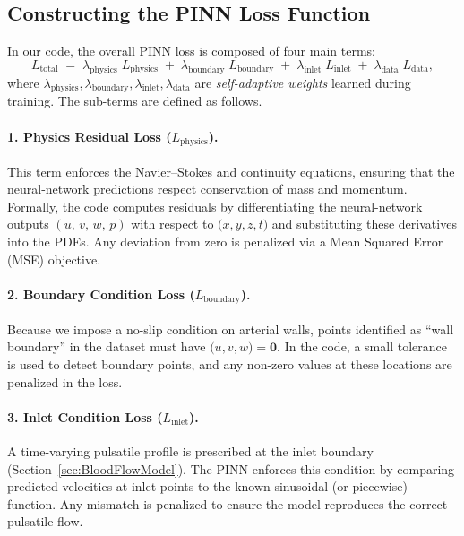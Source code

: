 \documentclass[12pt, a4paper]{article}
\begin{document}
\subsection{Constructing the PINN Loss Function}
\label{sec:PINN_Loss}

In our code, the overall PINN loss is composed of four main terms:
\[
L_{\mathrm{total}} 
\;=\;
\lambda_{\mathrm{physics}}\;L_{\mathrm{physics}}
\;+\;
\lambda_{\mathrm{boundary}}\;L_{\mathrm{boundary}}
\;+\;
\lambda_{\mathrm{inlet}}\;L_{\mathrm{inlet}}
\;+\;
\lambda_{\mathrm{data}}\;L_{\mathrm{data}},
\]
where \(\lambda_{\mathrm{physics}}, \lambda_{\mathrm{boundary}}, 
\lambda_{\mathrm{inlet}}, \lambda_{\mathrm{data}}\) are 
\emph{self-adaptive weights} learned during training. The sub-terms are defined
as follows.

\paragraph{1. Physics Residual Loss (\(L_{\mathrm{physics}}\)).}
This term enforces the Navier--Stokes and continuity equations, ensuring that the
neural-network predictions respect conservation of mass and momentum. Formally,
the code computes residuals by differentiating the neural-network outputs
\((u,\,v,\,w,\,p)\) with respect to \(\bigl(x,y,z,t\bigr)\) and substituting these
derivatives into the PDEs. Any deviation from zero is penalized via a Mean
Squared Error (MSE) objective.

\paragraph{2. Boundary Condition Loss (\(L_{\mathrm{boundary}}\)).}
Because we impose a no-slip condition on arterial walls, points identified as
``wall boundary” in the dataset must have \(\bigl(u,v,w\bigr)=\mathbf{0}\). In the
code, a small tolerance is used to detect boundary points, and any non-zero values
at these locations are penalized in the loss.

\paragraph{3. Inlet Condition Loss (\(L_{\mathrm{inlet}}\)).}
A time-varying pulsatile profile is prescribed at the inlet boundary
(Section~\ref{sec:BloodFlowModel}). The PINN enforces this condition by comparing
predicted velocities at inlet points to the known sinusoidal (or piecewise) function.
Any mismatch is penalized to ensure the model reproduces the correct pulsatile
flow.
\end{document}
